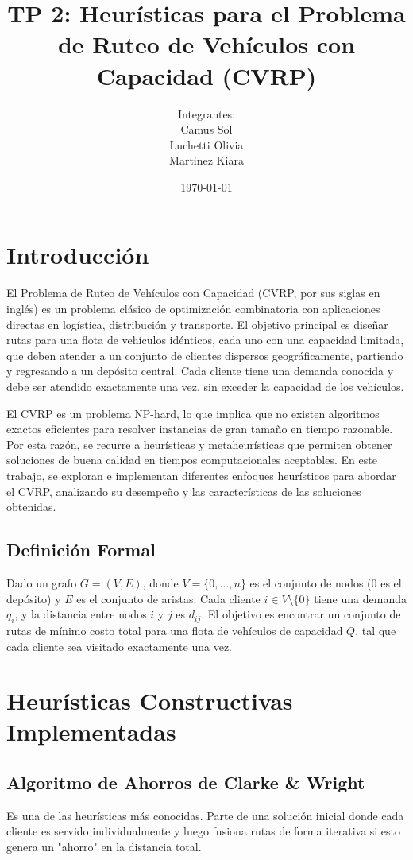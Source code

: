 \documentclass[a4paper,12pt]{article}
\title{TP 2: Heurísticas para el Problema de Ruteo de Vehículos con Capacidad (CVRP)}
\author{
    Integrantes: \\
    Camus Sol \\
    Luchetti Olivia \\
    Martinez Kiara \\
}
\date{\today}
\begin{document}
\maketitle

\tableofcontents
\newpage

\section{Introducción}

El Problema de Ruteo de Vehículos con Capacidad (CVRP, por sus siglas en inglés) es un problema clásico de optimización combinatoria con aplicaciones directas en logística, distribución y transporte. El objetivo principal es diseñar rutas para una flota de vehículos idénticos, cada uno con una capacidad limitada, que deben atender a un conjunto de clientes dispersos geográficamente, partiendo y regresando a un depósito central. Cada cliente tiene una demanda conocida y debe ser atendido exactamente una vez, sin exceder la capacidad de los vehículos.

El CVRP es un problema NP-hard, lo que implica que no existen algoritmos exactos eficientes para resolver instancias de gran tamaño en tiempo razonable. Por esta razón, se recurre a heurísticas y metaheurísticas que permiten obtener soluciones de buena calidad en tiempos computacionales aceptables. En este trabajo, se exploran e implementan diferentes enfoques heurísticos para abordar el CVRP, analizando su desempeño y las características de las soluciones obtenidas.

\subsection{Definición Formal}
Dado un grafo $G=(V,E)$, donde $V=\{0, ..., n\}$ es el conjunto de nodos (0 es el depósito) y $E$ es el conjunto de aristas. Cada cliente $i \in V \setminus \{0\}$ tiene una demanda $q_i$, y la distancia entre nodos $i$ y $j$ es $d_{ij}$. El objetivo es encontrar un conjunto de rutas de mínimo costo total para una flota de vehículos de capacidad $Q$, tal que cada cliente sea visitado exactamente una vez.

\section{Heurísticas Constructivas Implementadas}

\subsection{Algoritmo de Ahorros de Clarke \& Wright}
Es una de las heurísticas más conocidas. Parte de una solución inicial donde cada cliente es servido individualmente y luego fusiona rutas de forma iterativa si esto genera un "ahorro" en la distancia total.
\end{document}
